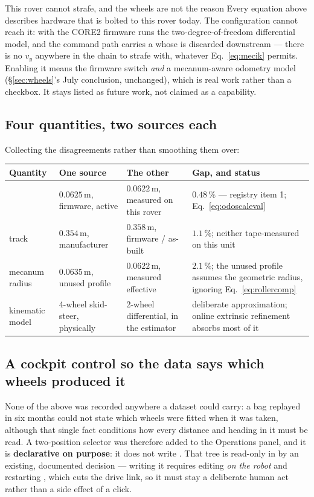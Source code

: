 \begin{trapbox}{This rover cannot strafe, and the wheels are not the reason}
Every equation above describes hardware that is bolted to this rover today.
The configuration cannot reach it: with  the
CORE2 firmware runs the two-degree-of-freedom differential model, and the
command path carries a  whose  is
discarded downstream --- there is no $v_y$ anywhere in the chain to strafe
with, whatever Eq.~\ref{eq:mecik} permits. Enabling it means the firmware
switch \emph{and} a mecanum-aware odometry model
(\S\ref{sec:wheels}'s July conclusion, unchanged), which is real work rather
than a checkbox. It stays listed as future work, not claimed as a
capability.
\end{trapbox}

\subsection{Four quantities, two sources each}
\label{sec:wheelgaps}
Collecting the disagreements rather than smoothing them over:
\begin{center}\small
\begin{tabular}{@{}L{2.6cm}L{3.2cm}L{3.3cm}L{3.4cm}@{}}
\toprule
Quantity & One source & The other & Gap, and status \\
\midrule
{} & $0.0625$\,m, firmware, active &
  $0.0622$\,m, measured on this rover &
  $0.48\,\%$ --- registry item 1; Eq.~\ref{eq:odoscaleval} \\
track & $0.354$\,m, manufacturer & $0.358$\,m, firmware / as-built &
  $1.1\,\%$; neither tape-measured on this unit \\
mecanum radius & $0.0635$\,m, unused profile &
  $0.0622$\,m, measured effective &
  $2.1\,\%$; the unused profile assumes the geometric radius, ignoring
  Eq.~\ref{eq:rollercomp} \\
kinematic model & 4-wheel skid-steer, physically &
  2-wheel differential, in the estimator &
  deliberate approximation; online extrinsic refinement absorbs most of it \\
\bottomrule
\end{tabular}
\end{center}

\subsection{A cockpit control so the data says which wheels produced it}
\label{sec:wheelselector}
None of the above was recorded anywhere a dataset could carry: a bag
replayed in six months could not state which wheels were fitted when it was
taken, although that single fact conditions how every distance and heading
in it must be read. A two-position selector was therefore added to the
Operations panel, and it is \textbf{declarative on purpose}: it does not
write . That tree is read-only in
 by an existing, documented decision --- writing it
requires editing  \emph{on the robot} and
restarting , which cuts the drive link, so it must stay a
deliberate human act rather than a side effect of a click.

